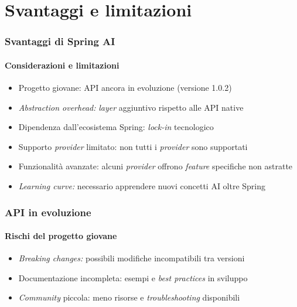\section{Svantaggi e limitazioni} %
\label{sec:spring_ai_disadvantages}
%
\begin{frame}[t,fragile] \frametitle{Svantaggi di Spring AI}
	{\small
		\framesubtitle{Considerazioni e limitazioni}
		\begin{itemize}[leftmargin=10pt,align=right]
			\onslide<1->\item[\alert{\faArrowCircleRight}] \alert{Progetto giovane:} API ancora in evoluzione (versione 1.0.2)
			\onslide<2->\item[\alert{\faArrowCircleRight}] \alert{\textit{Abstraction overhead:}} \textit{layer} aggiuntivo rispetto alle API native
			\onslide<3->\item[\alert{\faArrowCircleRight}] \alert{Dipendenza dall'ecosistema Spring:} \textit{lock-in} tecnologico
			\onslide<4->\item[\alert{\faArrowCircleRight}] \alert{Supporto \textit{provider} limitato:} non tutti i \textit{provider} sono supportati
			\onslide<5->\item[\alert{\faArrowCircleRight}] \alert{Funzionalità avanzate:} alcuni \textit{provider} offrono \textit{feature} specifiche non astratte
			\onslide<6->\item[\alert{\faArrowCircleRight}] \alert{\textit{Learning curve:}} necessario apprendere nuovi concetti AI oltre Spring
		\end{itemize}
	}
\end{frame}
%
\begin{frame}[t,fragile] \frametitle{API in evoluzione}
	{\small
		\framesubtitle{Rischi del progetto giovane}
		\begin{itemize}[leftmargin=10pt,align=right]
			\onslide<1->\item[\alert{\faArrowCircleRight}] \alert{\textit{Breaking changes:}} possibili modifiche incompatibili tra versioni
			\onslide<2->\item[\alert{\faArrowCircleRight}] \alert{Documentazione incompleta:} esempi e \textit{best practices} in sviluppo
			\onslide<3->\item[\alert{\faArrowCircleRight}] \alert{\textit{Community} piccola:} meno risorse e \textit{troubleshooting} disponibili
		\end{itemize}
	}
\end{frame}
